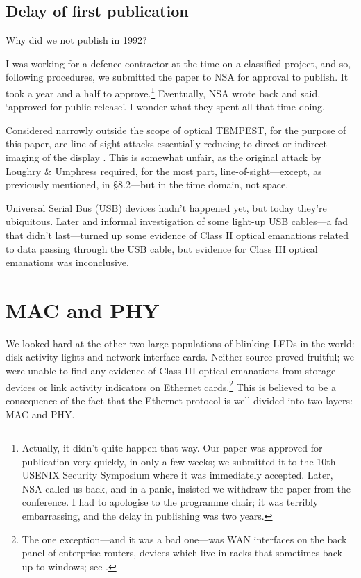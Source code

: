 \documentclass[conference]{IEEEtran}
\begin{document}
\subsection{Delay of first publication}

Why did we not publish in 1992?

I was working for a defence contractor at the time on a classified project,
and so, following procedures, we submitted the paper to NSA for approval to
publish. It took a year and a half to approve.\footnote{Actually, it didn't
quite happen that way. Our paper was approved for publication very quickly,
in only a few weeks; we submitted it to the 10th USENIX Security Symposium
where it was immediately accepted. Later, NSA called us back, and in a panic,
insisted we withdraw the paper from the conference. I had to apologise to the
programme chair; it was terribly embarrassing, and the delay in publishing was
two years.} Eventually, NSA wrote back and said, `approved for public
release'. I wonder what they spent all that time doing.

Considered narrowly outside the scope of optical TEMPEST, for the purpose of
this paper, are line-of-sight attacks essentially reducing to direct or
indirect imaging of the display
\cite{Backes2008,Backes2009a,Xu2013a,Jenkins2013a}. This is somewhat unfair,
as the original attack by Loughry \& Umphress required, for the most part,
line-of-sight---except, as previously mentioned, in \S 8.2---but in the time
domain, not space.

Universal Serial Bus (USB) devices hadn't happened yet, but today they're
ubiquitous. Later and informal investigation of some light-up USB cables---a
fad that didn't last---turned up some evidence of Class II optical emanations
related to data passing through the USB cable, but evidence for Class III
optical emanations was inconclusive.

\section{MAC and PHY}

We looked hard at the other two large populations of blinking LEDs in the
world: disk activity lights and network interface cards. Neither source
proved fruitful; we were unable to find any evidence of Class III optical
emanations from storage devices or link activity indicators on Ethernet
cards.\footnote{The one exception---and it was a bad one---was WAN interfaces
on the back panel of enterprise routers, devices which live in racks that
sometimes back up to windows; see \cite[\S 4.3.1]{Loughry2002a}.} This is
believed to be a consequence of the fact that the Ethernet protocol is well
divided into two layers: MAC and PHY.
\end{document}
